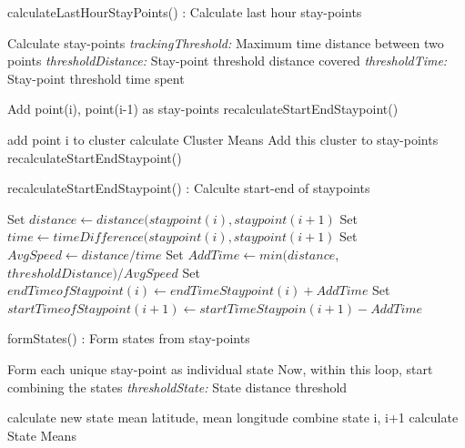 \documentclass{article}
\begin{document}
\begin{algorithm}
\caption{calculateLastHourStayPoints() : Calculate last hour stay-points}
\label{pseudoPSO}
\begin{algorithmic}[1]
\State Calculate stay-points
\State \textit{trackingThreshold:} Maximum time distance between two points
\State \textit{thresholdDistance:} Stay-point threshold distance covered
\State \textit{thresholdTime:} Stay-point threshold time spent

	\State Add point(i), point(i-1) as stay-points
	\State recalculateStartEndStaypoint()
\EndIf    

	\State add point i to cluster
	\State calculate Cluster Means
\Else
    	\State Add this cluster to stay-points
    	\State recalculateStartEndStaypoint()
	\EndIf
\EndIf
\EndFor
\end{algorithmic}
\end{algorithm}

\begin{algorithm}
\caption{recalculateStartEndStaypoint() : Calculte start-end of staypoints}
\label{pseudoPSO}
\begin{algorithmic}[1]
	\State Set $distance \gets distance(staypoint(i), staypoint(i+1)$
	\State Set $time \gets timeDifference(staypoint(i), staypoint(i+1)$
	\State Set $AvgSpeed \gets distance/time$
	\State Set $AddTime \gets min(distance$, $thresholdDistance)/AvgSpeed$
	\State Set $endTimeofStaypoint(i) \gets endTimeStaypoint(i) + AddTime$
	\State Set $startTimeofStaypoint(i+1) \gets startTimeStaypoin(i+1)-AddTime$
\EndFor
\end{algorithmic}
\end{algorithm}


\begin{algorithm}
\caption{formStates() : Form states from stay-points}
\label{pseudoPSO}
\begin{algorithmic}[1]

\State Form each unique stay-point as individual state
\State Now, within this loop, start combining the states
\State \textit{thresholdState:} State distance threshold

	\State calculate new state mean latitude, mean longitude
	\State combine state i, i+1
	\State calculate State Means
	\EndIf
\EndIf
\EndFor
\end{algorithmic}
\end{algorithm}
\end{document}
